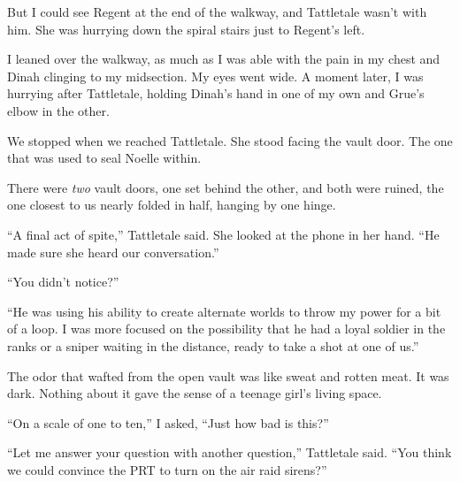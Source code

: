 But I could see Regent at the end of the walkway, and Tattletale wasn't with him.  She was hurrying down the spiral stairs just to Regent's left.



I leaned over the walkway, as much as I was able with the pain in my chest and Dinah clinging to my midsection.  My eyes went wide.  A moment later, I was hurrying after Tattletale, holding Dinah's hand in one of my own and Grue's elbow in the other.



We stopped when we reached Tattletale.  She stood facing the vault door.  The one that was used to seal Noelle within.



There were \emph{two} vault doors, one set behind the other, and both were ruined, the one closest to us nearly folded in half, hanging by one hinge.



``A final act of spite,'' Tattletale said.  She looked at the phone in her hand.  ``He made sure she heard our conversation.''



``You didn't notice?''



``He was using his ability to create alternate worlds to throw my power for a bit of a loop.  I was more focused on the possibility that he had a loyal soldier in the ranks or a sniper waiting in the distance, ready to take a shot at one of us.''



The odor that wafted from the open vault was like sweat and rotten meat.  It was dark.  Nothing about it gave the sense of a teenage girl's living space.



``On a scale of one to ten,'' I asked, ``Just how bad is this?''



``Let me answer your question with another question,'' Tattletale said.  ``You think we could convince the PRT to turn on the air raid sirens?''





